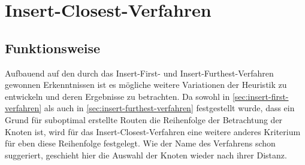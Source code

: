 \section{Insert-Closest-Verfahren} \label{sec:insert-closest-verfahren}
    \subsection{Funktionsweise}
Aufbauend auf den durch das Insert-First- und Insert-Furthest-Verfahren gewonnen Erkenntnissen ist es mögliche weitere Variationen der Heuristik zu entwickeln und deren Ergebnisse zu betrachten.
Da sowohl in \vref{sec:insert-first-verfahren} als auch in \vref{sec:insert-furthest-verfahren} festgestellt wurde, dass ein Grund für suboptimal erstellte Routen die Reihenfolge der Betrachtung der Knoten ist, wird für das Insert-Closest-Verfahren eine weitere anderes Kriterium für eben diese Reihenfolge festgelegt.
Wie der Name des Verfahrens schon suggeriert, geschieht hier die Auswahl der Knoten wieder nach ihrer Distanz.


